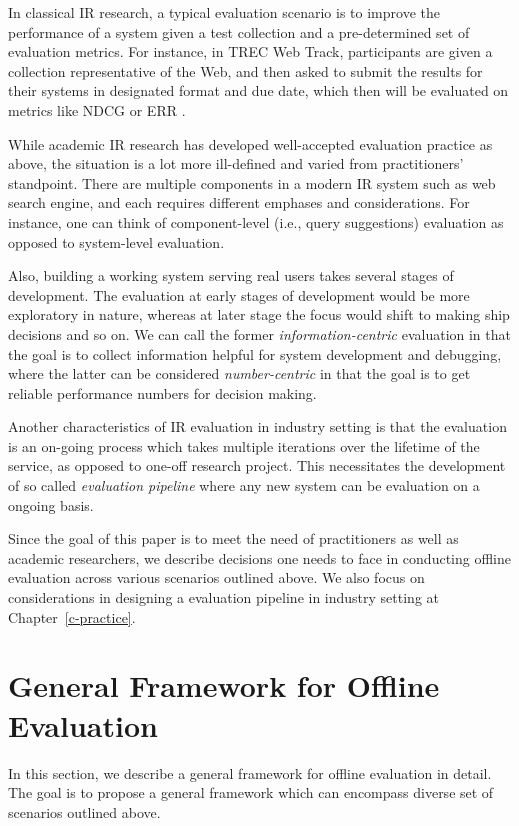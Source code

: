 In classical IR research, a typical evaluation scenario is to improve the performance of a system given a test collection and a pre-determined set of evaluation metrics. For instance, in TREC Web Track, participants are given a collection representative of the Web, and then asked to submit the results for their systems in designated format and due date, which then will be evaluated on metrics like NDCG \cite{Jarvelin:2002} or ERR \cite{ChapelleMZG09}.

While academic IR research has developed well-accepted evaluation practice as above, the situation is a lot more ill-defined and varied from practitioners' standpoint. There are multiple components in a modern IR system such as web search engine, and each requires different emphases and considerations. For instance, one can think of component-level (i.e., query suggestions) evaluation as opposed to system-level evaluation. 

Also, building a working system serving real users takes several stages of development. The evaluation at early stages of development would be more exploratory in nature, whereas at later stage the focus would shift to making ship decisions and so on. We can call the former \textit{information-centric} evaluation in that the goal is to collect information helpful for system development and debugging, where the latter can be considered \textit{number-centric} in that the goal is to get reliable performance numbers for decision making.

Another characteristics of IR evaluation in industry setting is that the evaluation is an on-going process which takes multiple iterations over the lifetime of the service, as opposed to one-off research project. This necessitates the development of so called \textit{evaluation pipeline} where any new system can be evaluation on a ongoing basis.  

Since the goal of this paper is to meet the need of practitioners as well as academic researchers, we describe decisions one needs to face in conducting offline evaluation across various scenarios outlined above. We also focus on considerations in designing a evaluation pipeline in industry setting at Chapter~\ref{c-practice}.

\section{General Framework for Offline Evaluation}

In this section, we describe a general framework for offline evaluation in detail. The goal is to propose a general framework which can encompass diverse set of scenarios outlined above. 

